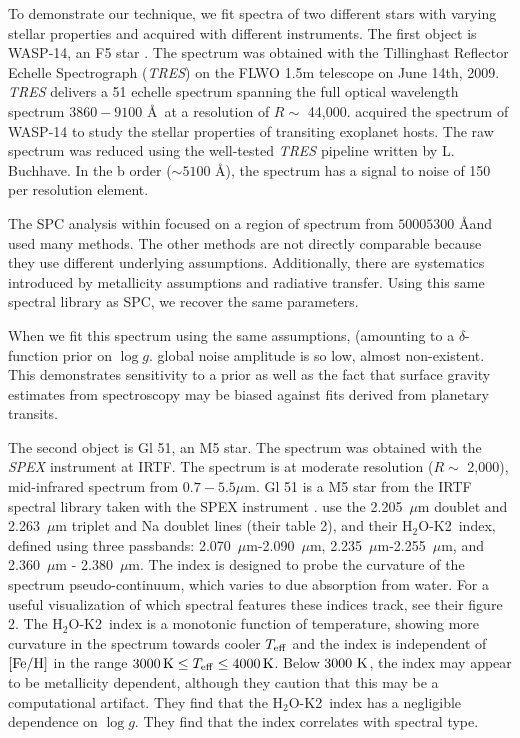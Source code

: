 \documentclass[iop,floatfix]{emulateapj}
\newcommand{\Z}{[{\rm Fe}/{\rm H}]}
\newcommand{\HK}{$\textrm{H}_2$O-K2}
\begin{document}
To demonstrate our technique, we fit spectra of two different stars with varying stellar properties and acquired with different instruments. The first object is WASP-14, an F5 star \citep{joshi09}. The spectrum was obtained with the Tillinghast Reflector Echelle Spectrograph (\emph{TRES}) \citep{mink11} on the FLWO 1.5m telescope on June 14th, 2009. \emph{TRES} delivers a 51 echelle spectrum spanning the full optical wavelength spectrum $3860 - 9100$ \AA\ at a resolution of $R \sim$ 44,000. \citet{torres12} acquired the spectrum of WASP-14 to study the stellar properties of transiting exoplanet hosts. The raw spectrum was reduced using the well-tested \emph{TRES} pipeline written by L. Buchhave. In the b order ($\sim 5100$ \AA), the spectrum has a signal to noise of 150 per resolution element.

The SPC analysis within \citet{torres12} focused on a region of spectrum from $5000 5300$ \AA and used many methods. The other methods are not directly comparable because they use different underlying assumptions. Additionally, there are systematics introduced by metallicity assumptions and radiative transfer. Using this same spectral library as SPC, we recover the same parameters.

When we fit this spectrum using the same assumptions, (amounting to a $\delta$-function prior on $\log g$. global noise amplitude is so low, almost non-existent. This demonstrates sensitivity to a prior as well as the fact that surface gravity estimates from spectroscopy may be biased against fits derived from planetary transits.

The second object is Gl 51, an M5 star. The spectrum was obtained with the \emph{SPEX} instrument at IRTF. The spectrum is at moderate resolution ($R \sim $ 2,000), mid-infrared spectrum from $0.7 - 5.5\mu$m. Gl 51 is a M5 star from the IRTF spectral library \citep{cushing05, rayner09} taken with the SPEX instrument \citep{rayner03}. \citep{rojas-ayala12} use the 2.205~$\mu$m  doublet and 2.263~$\mu$m  triplet and Na doublet lines (their table 2), and their \HK\ index, defined using three passbands: 2.070~$\mu$m-2.090~$\mu$m, 2.235~$\mu$m-2.255~$\mu$m, and 2.360~$\mu$m - 2.380~$\mu$m. The index is designed to probe the curvature of the spectrum pseudo-continuum, which varies to due absorption from water. For a useful visualization of which spectral features these indices track, see their figure 2. The \HK\ index is a monotonic function of temperature, showing more curvature in the spectrum towards cooler $T_{\rm eff}$ and the index is independent of $\Z$ in the range $3000\,{\rm K} \leq T_{\rm eff} \leq 4000\,{\rm K}$. Below $3000~{\rm K}$, the index may appear to be metallicity dependent, although they caution that this may be a computational artifact. They find that the \HK\ index has a negligible dependence on $\log g$. They find that the index correlates with spectral type.
\end{document}
